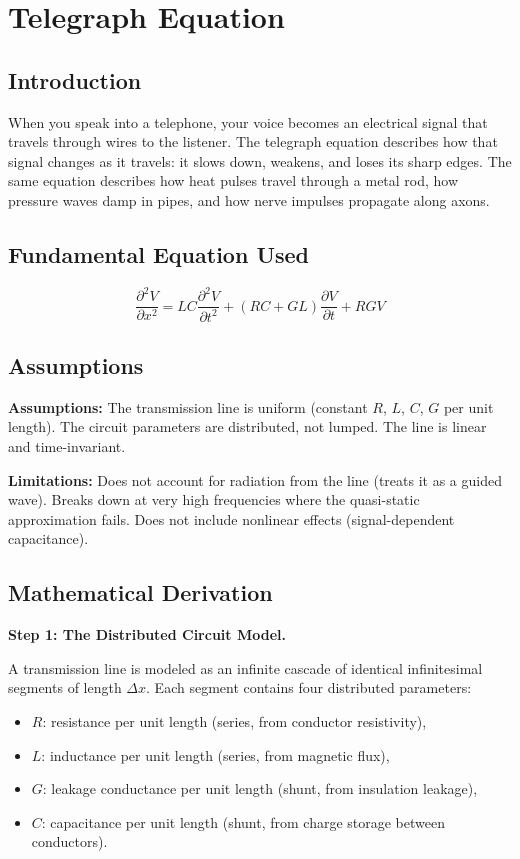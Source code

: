 \chapter{Telegraph Equation}

\section*{Introduction}

When you speak into a telephone, your voice becomes an electrical signal that travels through wires to the listener. The telegraph equation describes how that signal changes as it travels: it slows down, weakens, and loses its sharp edges. The same equation describes how heat pulses travel through a metal rod, how pressure waves damp in pipes, and how nerve impulses propagate along axons.

\section*{Fundamental Equation Used}

\[
\frac{\partial^2 V}{\partial x^2} = LC \frac{\partial^2 V}{\partial t^2} + (RC + GL)\frac{\partial V}{\partial t} + RGV
\]
\section*{Assumptions}

\textbf{Assumptions:} The transmission line is uniform (constant $R$, $L$, $C$, $G$ per unit length). The circuit parameters are distributed, not lumped. The line is linear and time-invariant.


\textbf{Limitations:} Does not account for radiation from the line (treats it as a guided wave). Breaks down at very high frequencies where the quasi-static approximation fails. Does not include nonlinear effects (signal-dependent capacitance).


\section*{Mathematical Derivation}

\textbf{Step 1: The Distributed Circuit Model.}

A transmission line is modeled as an infinite cascade of identical infinitesimal segments of length $\Delta x$. Each segment contains four distributed parameters:

\begin{itemize}
\item $R$: resistance per unit length (series, from conductor resistivity),
\item $L$: inductance per unit length (series, from magnetic flux),
\item $G$: leakage conductance per unit length (shunt, from insulation leakage),
\item $C$: capacitance per unit length (shunt, from charge storage between conductors).
\end{itemize}

